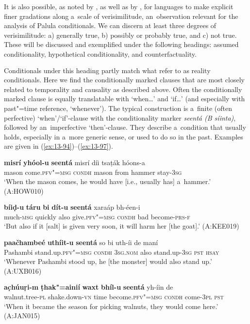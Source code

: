 It is also possible, as noted by \citet[255--260]{thompsonetal2007}, as well as by \citet[333--334]{givon2001b}, for languages to make explicit finer gradations along a~scale of verisimilitude, an~observation relevant for the analysis of Palula conditionals. We can discern at least three degrees of verisimilitude: a) generally true, b) possibly or probably true, and c) not true. These will be discussed and exemplified under the following headings: assumed conditionality, hypothetical conditionality, and counterfactuality.



 Conditionals under this heading partly match what \citet[255--256]{thompsonetal2007} refer to as reality conditionals. Here we find the conditionally marked clauses that are most closely related to temporality and causality as described above. Often the conditionally marked clause is equally translatable with `when{\ldots}' and `if{\ldots}' (and especially with past"=time reference, `whenever'). The typical construction is a~finite (often perfective) `when'/`if'-clause with the conditionality marker \textit{seentá (B síinta)}, followed by an~imperfective `then'-clause. They describe a~condition that usually holds, especially in a~more generic sense, or used to do so in the past. Examples are given in (\ref{ex:13-94})--(\ref{ex:13-97}).

\begin{exe}
\ex
\label{ex:13-94}
\gll \textbf{misrí} \textbf{yhóol-u} \textbf{seentá} misrí díi tsaṭák hóons-a \\
mason come.\textsc{pfv"=msg} \textsc{condh} mason from hammer stay-\textsc{3sg}  \\
\glt `When the mason comes, he would have [i.e., usually has] a~hammer.' (A:HOW010)

\ex
\label{ex:13-95}
\gll \textbf{bíiḍ-u} \textbf{táru} \textbf{bi} \textbf{dít-u} \textbf{seentá} xaraáp  bh-éen-i \\
much-\textsc{msg} quickly also give.\textsc{pfv"=msg} \textsc{condh} bad  become-\textsc{prs-f}   \\
\glt `But also if it [salt] is given very soon, it will harm her [the goat].' (A:KEE019)

\ex
\label{ex:13-96}
\gll \textbf{paačhambeé} \textbf{uthíit-u} \textbf{seentá} so bi  uth-íi de maní \\
Pashambi stand.up.\textsc{pfv"=msg} \textsc{condh} \textsc{3sg.nom} also stand.up-\textsc{3sg} \textsc{pst} \textsc{hsay}  \\
\glt `Whenever Pashambi stood up, he [the monster] would also stand up.' (A:UXB016)

\ex
\label{ex:13-97}
\gll \textbf{ac̣húuṛi-m} \textbf{ṭhak"=ainií} \textbf{waxt} \textbf{bhíl-u} \textbf{seentá}  yh-íin de \\
walnut.tree-\textsc{pl} shake.down-\textsc{vn} time become.\textsc{pfv"=msg} \textsc{condh} come-\textsc{3pl} \textsc{ pst}    \\
\glt `When it became the season for picking walnuts, they would come here.' (A:JAN015) 
\end{exe}

